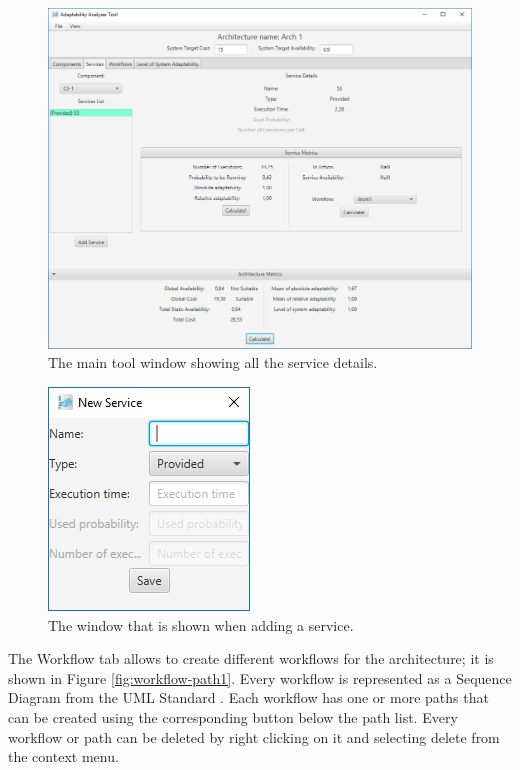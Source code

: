 \begin{figure}[!ht]
	\centerline
	{\includegraphics[scale=0.50]{img/serv_details.png}}
	\caption[Service details tab]{The main tool window showing all the service details.}
	\label{fig:serv-details}
\end{figure}

\begin{figure}[!ht]
	\centerline
	{\includegraphics[scale=0.6]{img/add_serv.png}}
	\caption[Add service window]{The window that is shown when adding a service.}
	\label{fig:add-serv}
\end{figure}

The Workflow tab allows to create different workflows for the architecture; it is shown in Figure \ref{fig:workflow-path1}. Every workflow is represented as a Sequence Diagram from the UML Standard \cite{uml}. Each workflow has one or more paths that can be created using the corresponding button below the path list. Every workflow or path can be deleted by right clicking on it and selecting delete from the context menu. 

